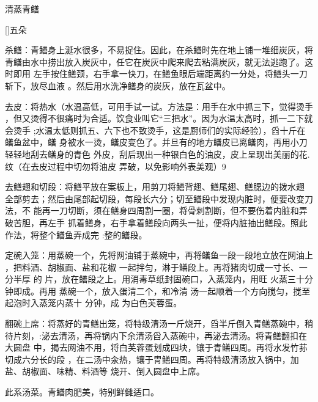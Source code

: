 \begin{recipe}{清蒸青鳝}

\ingredients


[\footnotemark]{五朵}

\preparation

\step 杀鳝：青鳝身上涎水很多，不易捉住。因此，在杀鳝时先在地上铺一堆细炭灰，将
青鳝由水中捞出放入炭灰中，任它在炭灰中爬来爬去粘满炭灰，就无法逃跑了。这时即用
左手按住鳝颈，右手拿一快刀，在鳝鱼眼后端距离约一分处，将鳝头一刀斩下，放尽血液
。然后用水洗净鳝身的炭灰，放在瓦盆中。

\step 去皮：将热水（水温高低，可用手试一试。方法是：用手在水中抓三下，觉得烫手
，但又烫得不很痛时为合适。饮食业叫它“三把水”。因为水温太高时，抓一二下就会烫手
;水温太低则抓五、六下也不致烫手，这是厨师们的实际经验），舀十斤在鳝鱼盆中，鳝
身被水一烫，鳝皮变色了。并旦有的地方鳝皮已离鳝肉，再用小刀轻轻地刮去鳝身的青色
外皮，刮后现出一种银白色的油皮，皮上呈现岀美丽的花.纹（在去皮过程中切勿将油皮
弄破，以免影响外表美观）9

\step 去鳝翅和切段：将鳝平放在案板上，用剪刀将鳝背翅、鳝尾翅、鳝腮边的拨水翅
全部剪去；然后由尾部起切段，每段长六分；切至鳝段中发现内脏时，便要改变刀法，不
能再一刀切断，须在鳝身四周割一圈，将骨刺割断，但不要伤着内脏和弄破苦胆，再左手
抓着鳝身，右手拿着鳝段向两头一扯，便将内脏抽出鳝段。照此作法，将整个鳝鱼弄成完
:整的鳝段。

\step 定碗入笼：用蒸碗一个，先将网油铺于蒸碗中，再将鳝鱼一段一段地立放在网油上
，把料酒、胡椒面、盐和花椒 一起拌匀，淋于鳝段上。再将猪肉切成一寸长、一分半厚
的 片，放在鳝段之上。用消毒草纸封固碗口，入蒸笼内，用旺 火蒸三十分钟即成。再用
蒸碗一个，放入蛋清二个，和冷清 汤一起顺着一个方向搅匀，搅至起泡时入蒸笼内蒸十
分钟，成 为白色芙蓉蛋。

\step 翻碗上席：将蒸好的青鳝出笼，将特级清汤一斤烧开，舀半斤倒入青鳝蒸碗中，稍
待片刻，:泌去清汤，再将锅内下余清汤舀入蒸碗中，再泌去清汤。将青鳝翻扣在大圆盘
中，揭去网油不用，将白芙蓉蛋划成四块，镶于青鳝四周。再将水发竹荪切成六分长的段
，在二汤中汆热，镶于冑鳝四周。再将特级清汤放入锅中，加盐、胡椒面、味精、料酒等
烧开、倒入圆盘中上席。

\features

此系汤菜。青鳝肉肥美，特别鲜雠适口。


\end{recipe}

